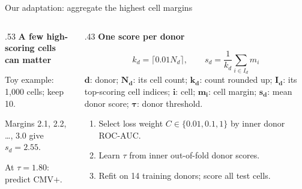 \documentclass[aspectratio=169,10pt]{beamer}
\newcommand{\eyebrow}[1]{{\color{Teal}\bfseries #1}\par\smallskip}
\newcommand{\compactmath}{%
  \setlength{\abovedisplayskip}{4pt}\setlength{\belowdisplayskip}{4pt}%
  \setlength{\abovedisplayshortskip}{2pt}\setlength{\belowdisplayshortskip}{4pt}}
\begin{document}
\begin{frame}{Our adaptation: aggregate the highest cell margins}
  \small\compactmath
  \begin{columns}[c,onlytextwidth]
    \begin{column}{.53\textwidth}
      \eyebrow{A few high-scoring cells can matter}
      \par\smallskip
      \small Toy example: 1,000 cells; keep 10.\par
      Margins 2.1, 2.2, \ldots, 3.0 give $s_d=2.55$.\par
      At $\tau=1.80$: predict CMV$+$.
    \end{column}
    \begin{column}{.43\textwidth}
      \eyebrow{One score per donor}
      \[k_d=\lceil0.01N_d\rceil,\qquad
        s_d=\frac{1}{k_d}\sum_{i\in I_d}m_i\]
      {\scriptsize $\boldsymbol{d}$: donor; $\boldsymbol{N_d}$: its cell count; $\boldsymbol{k_d}$: count rounded up; $\boldsymbol{I_d}$: its top-scoring cell indices; $\boldsymbol{i}$: cell; $\boldsymbol{m_i}$: cell margin; $\boldsymbol{s_d}$: mean donor score; $\boldsymbol{\tau}$: donor threshold.}\par\smallskip
      \begin{enumerate}\setlength\itemsep{3pt}
        \item Select loss weight $C\in\{0.01,0.1,1\}$ by inner donor ROC-AUC.
        \item Learn $\tau$ from inner out-of-fold donor scores.
        \item Refit on 14 training donors; score all test cells.
      \end{enumerate}
    \end{column}
  \end{columns}
\end{frame}
\end{document}
